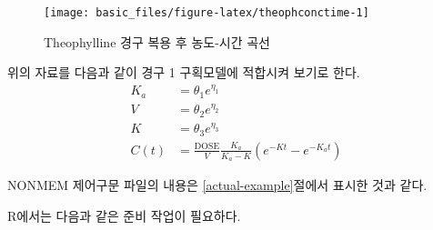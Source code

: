\documentclass[
  10pt,
  krantz2,
  a4paper]{krantz}
\theoremstyle{definition}
\theoremstyle{definition}
\theoremstyle{definition}
\theoremstyle{remark}
\begin{document}
\begin{figure}
\texttt{[image: basic\_files/figure-latex/theophconctime-1]} \caption{Theophylline 경구 복용 후 농도-시간 곡선}\label{fig:theophconctime}
\end{figure}

위의 자료를 다음과 같이 경구 1 구획모델에 적합시켜 보기로 한다.
\begin{equation}
\begin{split}
  K_{a} & = \theta_{1}e^{\eta_{1}} \\
  V & = \theta_{2}e^{\eta_{2}} \\
  K & = \theta_{3}e^{\eta_{3}} \\
  C(t) & = \frac{\text{DOSE}}{V}\frac{K_{a}}{K_{a} - K}(e^{- Kt} - e^{- K_{a}t})
\end{split}
\label{eq:onecompfit}
\end{equation}

NONMEM 제어구문 파일의 내용은 \ref{actual-example}절에서 표시한 것과 같다.

R에서는 다음과 같은 준비 작업이 필요하다.
\end{document}
